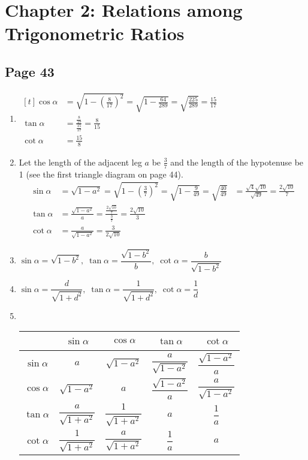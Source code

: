 \documentclass{article}
\newenvironment{solutions}[1]
{\subsection*{#1}
 \begin{enumerate}[leftmargin=1.5em]}
{\end{enumerate}}
\newcommand{\solution}{\item}
\begin{document}
\section*{Chapter 2: Relations among Trigonometric Ratios}

\begin{solutions}{Page 43}
\solution %
$\begin{aligned}[t]
\cos{\alpha} &= \sqrt{1 - \left(\frac{8}{17}\right)^2} = \sqrt{1 - \frac{64}{289}} = \sqrt{\frac{225}{289}} = \frac{15}{17} \\
\tan{\alpha} &= \frac{\frac{8}{17}}{\frac{15}{17}} = \frac{8}{15} \\
\cot{\alpha} &= \frac{15}{8}
\end{aligned}$

\solution %
Let the length of the adjacent leg $a$ be $\frac{3}{7}$ and the length of the hypotenuse be 1 (see the first triangle diagram on page 44).
\begin{align*}
\sin{\alpha} &= \sqrt{1 - a^2} = \sqrt{1 - \left(\frac{3}{7}\right)^2} = \sqrt{1 - \frac{9}{49}} = \sqrt{\frac{40}{49}} &= \frac{\sqrt{4}\sqrt{10}}{\sqrt{49}} = \frac{2\sqrt{10}}{7} \\
\tan{\alpha} &= \frac{\sqrt{1 - a^2}}{a} = \frac{\frac{2\sqrt{10}}{7}}{\frac{3}{7}} = \frac{2\sqrt{10}}{3} \\
\cot{\alpha} &= \frac{a}{\sqrt{1 - a^2}} = \frac{3}{2\sqrt{10}}
\end{align*}

\solution %
$\sin{\alpha} = \sqrt{1 - b^2},\;
\tan{\alpha} = \dfrac{\sqrt{1 - b^2}}{b},\; 
\cot{\alpha} = \dfrac{b}{\sqrt{1 - b^2}}$

\solution %
$\sin{\alpha} = \dfrac{d}{\sqrt{1 + d^2}},\;
\tan{\alpha} = \dfrac{1}{\sqrt{1 + d^2}},\; 
\cot{\alpha} = \dfrac{1}{d}$

\solution ~ %
\begin{center}
\bgroup
\def\arraystretch{2.1}
\setlength\tabcolsep{15pt}
\begin{tabular}{ |c|c|c|c|c| }
\hline
~              & $\sin{\alpha}$             & $\cos{\alpha}$             & $\tan{\alpha}$             & $\cot{\alpha}$ \\
\hline
$\sin{\alpha}$ & $a$                        & $\sqrt{1 - a^2}$           & $\dfrac{a}{\sqrt{1 - a^2}}$ & $\dfrac{\sqrt{1 - a^2}}{a}$ \\
\hline
$\cos{\alpha}$ & $\sqrt{1 - a^2}$           & $a$                        & $\dfrac{\sqrt{1 - a^2}}{a}$ & $\dfrac{a}{\sqrt{1 - a^2}}$ \\
\hline
$\tan{\alpha}$ & $\dfrac{a}{\sqrt{1 + a^2}}$ & $\dfrac{1}{\sqrt{1 + a^2}}$ & $a$                       & $\dfrac{1}{a}$ \\
\hline
$\cot{\alpha}$ & $\dfrac{1}{\sqrt{1 + a^2}}$ & $\dfrac{a}{\sqrt{1 + a^2}}$ & $\dfrac{1}{a}$              & $a$ \\
\hline
\end{tabular}
\egroup
\end{center}


\end{solutions}
\end{document}
